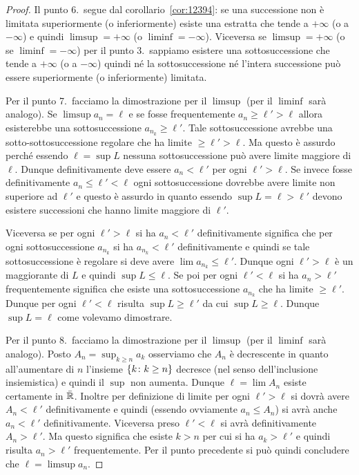 \begin{proof}
  Il punto 6.\ segue dal corollario~\ref{cor:12394}: se una successione
  non è limitata superiormente (o inferiormente)
  esiste una estratta che tende a $+\infty$ (o a $-\infty$) e quindi
  $\limsup  = +\infty$ (o $\liminf = -\infty$).
  Viceversa se $\limsup = +\infty$ (o se $\liminf = -\infty$)
  per il punto 3.\ sappiamo esistere
  una sottosuccessione che tende a $+\infty$ (o a $-\infty$)
  quindi né la sottosuccessione
  né l'intera successione può essere superiormente (o inferiormente) limitata.

  Per il punto 7.\ facciamo la dimostrazione per il $\limsup$ (per il $\liminf$
  sarà analogo). Se $\limsup a_n = \ell$ e se fosse frequentemente
  $a_n \ge \ell' > \ell$ allora esisterebbe una sottosuccessione $a_{n_k}\ge \ell'$.
  Tale sottosuccessione avrebbe una sotto-sottosuccessione regolare
  che ha limite $\ge \ell'> \ell$.
  Ma questo è assurdo perché essendo $\ell=\sup L$ nessuna sottosuccessione
  può avere limite maggiore di $\ell$.
  Dunque definitivamente deve essere $a_n < \ell'$ per ogni $\ell'>\ell$.
  Se invece fosse definitivamente $a_n \le \ell' < \ell$ ogni
  sottosuccessione dovrebbe avere limite non superiore ad $\ell'$
  e questo è assurdo in quanto essendo $\sup L = \ell > \ell'$
  devono esistere successioni che hanno limite maggiore di $\ell'$.

  Viceversa se per ogni $\ell'>\ell$ si ha $a_n<\ell'$ definitivamente
  significa che per ogni sottosuccessione $a_{n_k}$ si ha
  $a_{n_k} < \ell'$ definitivamente e quindi se tale sottosuccessione
  è regolare si deve avere $\lim a_{n_k} \le \ell'$. Dunque
  ogni $\ell'>\ell$ è un maggiorante di $L$ e quindi $\sup L\le \ell$.
  Se poi per ogni $\ell'<\ell$ si ha $a_n>\ell'$ frequentemente
  significa che esiste una sottosuccessione $a_{n_k}$ che
  ha limite $\ge \ell'$. Dunque per ogni $\ell'<\ell$ risulta
  $\sup L \ge \ell'$ da cui $\sup L \ge \ell$. Dunque $\sup L=\ell$
  come volevamo dimostrare.

  Per il punto 8.\ facciamo la dimostrazione per il $\limsup$ (per il $\liminf$
  sarà analogo).
  Posto $A_n = \sup_{k\ge n} a_k$ osserviamo che $A_n$ è decrescente
  in quanto all'aumentare di $n$ l'insieme
  ${\left\{ k\colon k \ge n \right\}}$ decresce (nel senso dell'inclusione insiemistica)
  e quindi
  il $\sup$ non aumenta.
  Dunque $\ell=\lim A_n$ esiste certamente in $\bar {\mathbb R}$.
  Inoltre per definizione di limite per ogni $\ell'>\ell$
  si dovrà avere $A_n < \ell'$ definitivamente e quindi
  (essendo ovviamente $a_n \le A_n$) si avrà
  anche $a_n < \ell'$ definitivamente.
  Viceversa preso $\ell'<\ell$ si avrà definitivamente
  $A_n > \ell'$. Ma questo significa che esiste $k>n$
  per cui si ha $a_k > \ell'$ e quindi
  risulta $a_n > \ell'$ frequentemente.
  Per il punto precedente si può quindi concludere che
  $\ell = \limsup a_n$.
\end{proof}

